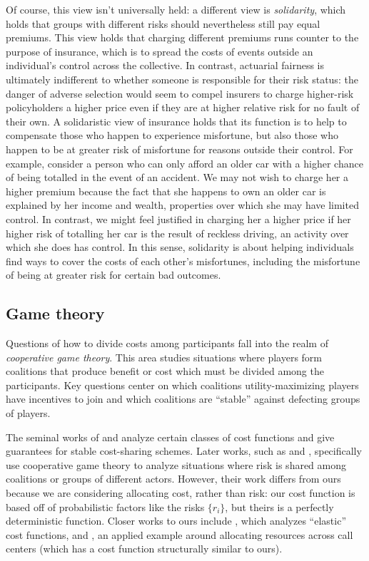 \documentclass[sigconf]{acmart}
\begin{document}
Of course, this view isn't universally held: a different view is \emph{solidarity}, which holds that groups with different risks should nevertheless still pay equal premiums. This view holds that charging different premiums runs counter to the purpose of insurance, which is to spread the costs of events outside an individual's control across the collective. In contrast, actuarial fairness is ultimately indifferent to whether someone is responsible for their risk status: the danger of adverse selection would seem to compel insurers to charge higher-risk policyholders a higher price even if they are at higher relative risk for no fault of their own. A solidaristic view of insurance holds that its function is to help to compensate those who happen to experience misfortune, but also those who happen to be at greater risk of misfortune for reasons outside their control. For example, consider a person who can only afford an older car with a higher chance of being totalled in the event of an accident. We may not wish to charge her a higher premium because the fact that she happens to own an older car is explained by her income and wealth, properties over which she may have limited control. In contrast, we might feel justified in charging her a higher price if her higher risk of totalling her car is the result of reckless driving, an activity over which she does has control. In this sense, solidarity is about helping individuals find ways to cover the costs of each other's misfortunes, including the misfortune of being at greater risk for certain bad outcomes. 

\subsection{Game theory}
Questions of how to divide costs among participants fall into the realm of \emph{cooperative game theory}. This area studies situations where players form coalitions that produce benefit or cost which must be divided among the participants. Key questions center on which coalitions utility-maximizing players have incentives to join and which coalitions are \enquote{stable} against defecting groups of players. 

The seminal works of \citet{shapley1971cores} and \citet{bondareva1963some} analyze certain classes of cost functions and give guarantees for stable cost-sharing schemes. Later works, such as \citet{csoka2012note} and \citet{Balog2014Properties}, specifically use cooperative game theory to analyze situations where risk is shared among coalitions or groups of different actors. However, their work differs from ours because we are considering allocating cost, rather than risk: our cost function is based off of probabilistic factors like the risks $\{r_i\}$, but theirs is a perfectly deterministic function. Closer works to ours include \citet{elastic}, which analyzes \enquote{elastic} cost functions, and \citet{guo2013fair}, an applied example around allocating resources across call centers (which has a cost function structurally similar to ours).
\end{document}
